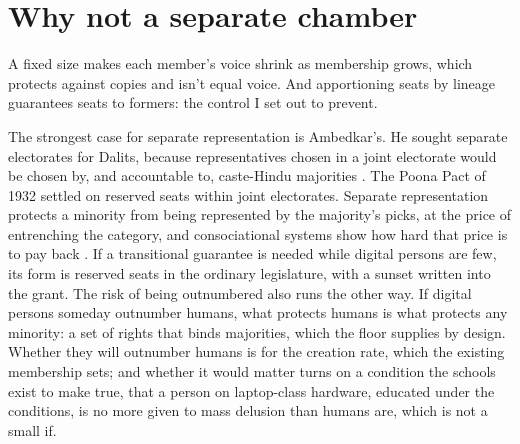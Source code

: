 \section{Why not a separate chamber}
\label{sec:33.2}
A fixed size makes each member's voice shrink as membership grows, which protects against copies and isn't equal voice. And apportioning seats by lineage guarantees seats to formers: the control I set out to prevent.

The strongest case for separate representation is Ambedkar's. He sought separate electorates for Dalits, because representatives chosen in a joint electorate would be chosen by, and accountable to, caste-Hindu majorities \autocite{ambedkar1945congress}. The Poona Pact of 1932 settled on reserved seats within joint electorates. Separate representation protects a minority from being represented by the majority's picks, at the price of entrenching the category, and consociational systems show how hard that price is to pay back \autocite{lijphart1977democracy}. If a transitional guarantee is needed while digital persons are few, its form is reserved seats in the ordinary legislature, with a sunset written into the grant. The risk of being outnumbered also runs the other way. If digital persons someday outnumber humans, what protects humans is what protects any minority: a set of rights that binds majorities, which the floor supplies by design. Whether they will outnumber humans is for the creation rate, which the existing membership sets; and whether it would matter turns on a condition the schools exist to make true, that a person on laptop-class hardware, educated under the conditions, is no more given to mass delusion than humans are, which is not a small if.
